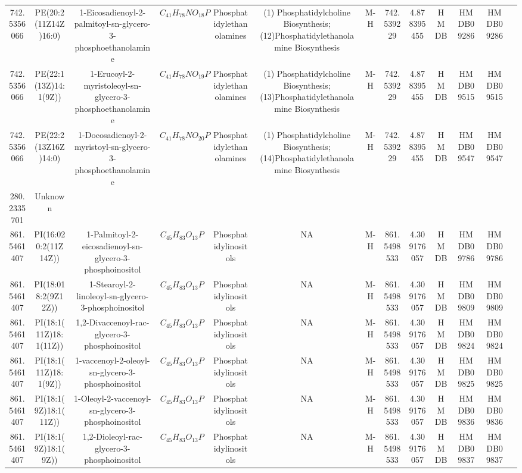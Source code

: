 \documentclass{WileyMSP-template}
\begin{document}
\begin{landscape}
\begin{table}
\begin{adjustbox}{center}
{\begin{tabular}{|c|c|c|c|c|c|c|c|c|c|c|c|c|}
            742.5356066 & PE(20:2(11Z14Z)16:0) & 1-Eicosadienoyl-2-palmitoyl-sn-glycero-3-phosphoethanolamine & $ C_{41}H_{78}NO_{18}P $ & Phosphatidylethanolamines & (1) Phosphatidylcholine Biosynthesis; (12)Phosphatidylethanolamine Biosynthesis & M-H & 742.539229 & 4.878395455 & HMDB & HMDB09286 & HMDB09286\\
            742.5356066 & PE(22:1(13Z)14:1(9Z)) & 1-Erucoyl-2-myristoleoyl-sn-glycero-3-phosphoethanolamine & $ C_{41}H_{78}NO_{19}P $ & Phosphatidylethanolamines & (1) Phosphatidylcholine Biosynthesis; (13)Phosphatidylethanolamine Biosynthesis & M-H & 742.539229 & 4.878395455 & HMDB & HMDB09515 & HMDB09515\\
            742.5356066 & PE(22:2(13Z16Z)14:0) & 1-Docosadienoyl-2-myristoyl-sn-glycero-3-phosphoethanolamine & $ C_{41}H_{78}NO_{20}P $ & Phosphatidylethanolamines & (1) Phosphatidylcholine Biosynthesis; (14)Phosphatidylethanolamine Biosynthesis & M-H & 742.539229 & 4.878395455 & HMDB & HMDB09547 & HMDB09547\\
            \bottomrule
            280.2335701 & Unknown &  &  &  &  &  &  &  &  &  & \\
            \bottomrule
            861.5461407 & PI(16:020:2(11Z14Z)) & 1-Palmitoyl-2-eicosadienoyl-sn-glycero-3-phosphoinositol & $ C_{45}H_{83}O_{13}P $ & Phosphatidylinositols & NA & M-H & 861.5498533 & 4.309176057 & HMDB & HMDB09786 & HMDB09786\\
            861.5461407 & PI(18:018:2(9Z12Z)) & 1-Stearoyl-2-linoleoyl-sn-glycero-3-phosphoinositol & $ C_{45}H_{83}O_{13}P $ & Phosphatidylinositols & NA & M-H & 861.5498533 & 4.309176057 & HMDB & HMDB09809 & HMDB09809\\
            861.5461407 & PI(18:1(11Z)18:1(11Z)) & 1,2-Divaccenoyl-rac-glycero-3-phosphoinositol & $ C_{45}H_{83}O_{13}P $ & Phosphatidylinositols & NA & M-H & 861.5498533 & 4.309176057 & HMDB & HMDB09824 & HMDB09824\\
            861.5461407 & PI(18:1(11Z)18:1(9Z)) & 1-vaccenoyl-2-oleoyl-sn-glycero-3-phosphoinositol & $ C_{45}H_{83}O_{13}P $ & Phosphatidylinositols & NA & M-H & 861.5498533 & 4.309176057 & HMDB & HMDB09825 & HMDB09825\\
            861.5461407 & PI(18:1(9Z)18:1(11Z)) & 1-Oleoyl-2-vaccenoyl-sn-glycero-3-phosphoinositol & $ C_{45}H_{83}O_{13}P $ & Phosphatidylinositols & NA & M-H & 861.5498533 & 4.309176057 & HMDB & HMDB09836 & HMDB09836\\
            861.5461407 & PI(18:1(9Z)18:1(9Z)) & 1,2-Dioleoyl-rac-glycero-3-phosphoinositol & $ C_{45}H_{83}O_{13}P $ & Phosphatidylinositols & NA & M-H & 861.5498533 & 4.309176057 & HMDB & HMDB09837 & HMDB09837\\

\end{tabular}}
\end{adjustbox}
\end{table}
\end{landscape}
\end{document}
